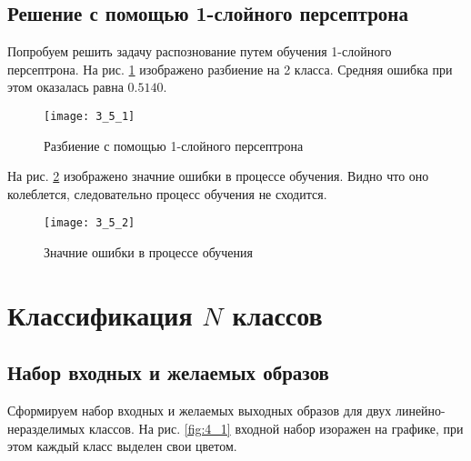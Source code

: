 \subsection{Решение с помощью 1-слойного персептрона}


Попробуем решить задачу распознование путем обучения 1-слойного персептрона. На рис. \ref{fig:3_5_1} изображено разбиение на 2 класса. Средняя ошибка при этом оказалась равна $0.5140$.

\begin{figure}[H]
\begin{center}
	\texttt{[image: 3\_5\_1]}
	\caption{Разбиение с помощью 1-слойного персептрона}
	\label{fig:3_5_1}
\end{center}
\end{figure}

На рис. \ref{fig:3_5_2} изображено значние ошибки в процессе обучения. Видно что оно колеблется, следовательно процесс обучения не сходится.

\begin{figure}[H]
\begin{center}
	\texttt{[image: 3\_5\_2]}
	\caption{Значние ошибки в процессе обучения}
	\label{fig:3_5_2}
\end{center}
\end{figure}



\section{Классификация $N$ классов}

\subsection{Набор входных и желаемых образов}

Сформируем набор входных и желаемых выходных образов для двух линейно-неразделимых классов. На рис. \ref{fig:4_1} входной набор изоражен на графике, при этом каждый класс выделен свои цветом.

